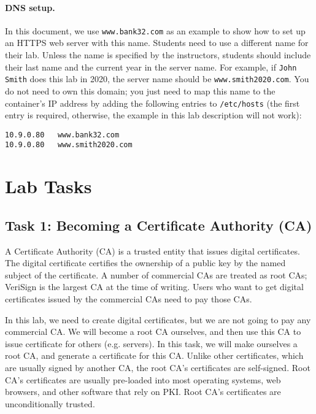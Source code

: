 \paragraph{DNS setup.} In this document, we use \texttt{www.bank32.com} 
as an example to show how to set up an HTTPS web server with this name. 
Students need to use a different name for their lab. Unless the name
is specified by the instructors, students should 
include their last name and the current year in the server name. 
For example, if \texttt{John Smith} does this lab in 2020,
the server name should be \texttt{www.smith2020.com}. You do not need to
own this domain; you just need to map this name to the container's
IP address by adding the following entries to
\texttt{/etc/hosts} (the first entry is required, otherwise, the example
in this lab description will not work):

\begin{lstlisting}
10.9.0.80   www.bank32.com
10.9.0.80   www.smith2020.com
\end{lstlisting}
 


\section{Lab Tasks}


\subsection{Task 1: Becoming a Certificate Authority (CA)}

A Certificate Authority (CA) is a trusted entity that issues digital certificates. 
The digital certificate certifies the ownership of a public key by 
the named subject of the certificate. A number of commercial 
CAs are treated as root CAs; VeriSign is the largest CA at the time of 
writing. Users who want to get digital certificates issued
by the commercial CAs need to pay those CAs.


In this lab, we need to create digital certificates, but we are not going to pay
any commercial CA. We will become a root CA ourselves, and then use this CA to 
issue certificate for others (e.g. servers). In this task, we will make
ourselves a root CA, and generate a certificate for this CA. Unlike 
other certificates, which are usually signed by another CA, the root CA's 
certificates are self-signed. Root CA's certificates are usually pre-loaded
into most operating systems, web browsers, and other software that rely on PKI.
Root CA's certificates are unconditionally trusted.


